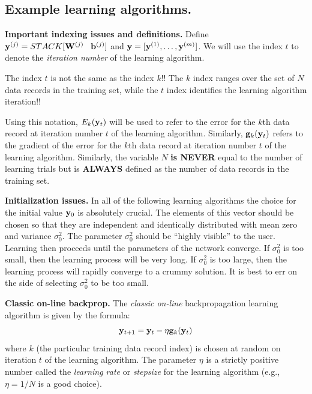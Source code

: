 \documentclass{report}
\begin{document}
\subsection{Example learning algorithms.}\label{learningAlgs}

{\bf Important indexing issues and definitions.}
Define ${\bf y}^{(j)} = STACK [{\bf W}^{(j)} \;\;\; {\bf b}^{(j)}]$
and ${\bf y} = [{\bf y}^{(1)}, \ldots, {\bf y}^{(m)}]$. We will use
the index $t$ to denote the {\em iteration number} of the learning
algorithm.
\begin{em}
The index $t$ is not the same as the index $k$!! The $k$ index ranges
over the set of $N$ data records in the training set, while the $t$
index identifies the learning algorithm iteration!!
\end{em}
Using this notation, $E_k({\bf y}_t)$ will be used to refer to the
error for the $k$th data record at iteration number $t$ of the
learning algorithm. Similarly, ${\bf g}_k({\bf y}_t)$ refers to the
gradient of the error for the $k$th data record at iteration number
$t$ of the learning algorithm. Similarly, the variable $N$ {\bf is
NEVER} equal to the number of learning trials but is {\bf ALWAYS}
defined as the number of data records in the training set.

{\bf Initialization issues.}  In all of the following learning
algorithms the choice for the initial value ${\bf y}_0$ is absolutely
crucial. The elements of this vector should be chosen so that they are
independent and identically distributed with mean zero and variance
$\sigma_0^2$. The parameter $\sigma_0^2$ should be ``highly visible''
to the user. Learning then proceeds until the parameters of the
network converge. If $\sigma_0^2$ is too small, then the learning
process will be very long. If $\sigma_0^2$ is too large, then the
learning process will rapidly converge to a crummy solution. It is
best to err on the side of selecting $\sigma_0^2$ to be too small.

{\bf Classic on-line backprop.}
The {\em classic on-line}
backpropagation learning algorithm is given by the formula:
\begin{equation}
{\bf y}_{t+1} = {\bf y}_t - \eta {\bf g}_k({\bf y}_t)
\end{equation}
where $k$ (the particular training data record index) is chosen at
random on iteration $t$ of the learning algorithm.  The parameter
$\eta$ is a strictly positive number called the {\em learning rate} or
{\em stepsize} for the learning algorithm (e.g., $\eta = 1/N$ is a
good choice).
\end{document}
